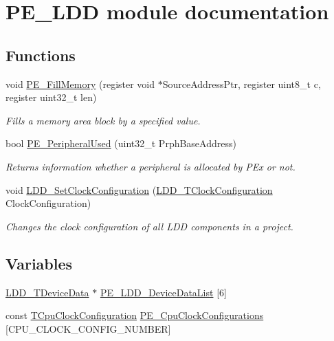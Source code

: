 \hypertarget{group___p_e___l_d_d__module}{}\section{P\+E\+\_\+\+L\+DD module documentation}
\label{group___p_e___l_d_d__module}
\subsection*{Functions}
\begin{DoxyCompactItemize}
\item 
void \hyperlink{group___p_e___l_d_d__module_ga6cb22864b71fd00f200c9fb3375f4e29}{P\+E\+\_\+\+Fill\+Memory} (register void $\ast$Source\+Address\+Ptr, register uint8\+\_\+t c, register uint32\+\_\+t len)
\begin{DoxyCompactList}\small\item\em Fills a memory area block by a specified value. \end{DoxyCompactList}\item 
bool \hyperlink{group___p_e___l_d_d__module_ga9e049b01a45212fe5b6a8476fe124b59}{P\+E\+\_\+\+Peripheral\+Used} (uint32\+\_\+t Prph\+Base\+Address)
\begin{DoxyCompactList}\small\item\em Returns information whether a peripheral is allocated by P\+Ex or not. \end{DoxyCompactList}\item 
void \hyperlink{group___p_e___l_d_d__module_ga7fe8a131453ba765c5e85130a282eafb}{L\+D\+D\+\_\+\+Set\+Clock\+Configuration} (\hyperlink{group___p_e___types__module_ga369bcaf7f00caad5f994c72ac2629a37}{L\+D\+D\+\_\+\+T\+Clock\+Configuration} Clock\+Configuration)
\begin{DoxyCompactList}\small\item\em Changes the clock configuration of all L\+DD components in a project. \end{DoxyCompactList}\end{DoxyCompactItemize}
\subsection*{Variables}
\begin{DoxyCompactItemize}
\item 
\hyperlink{group___p_e___types__module_gac5cf1362f1f0e3a2ce71b1bf2276d091}{L\+D\+D\+\_\+\+T\+Device\+Data} $\ast$ \hyperlink{group___p_e___l_d_d__module_ga654c73169e3f1d8c3106e15497086517}{P\+E\+\_\+\+L\+D\+D\+\_\+\+Device\+Data\+List} \mbox{[}6\mbox{]}
\item 
const \hyperlink{struct_t_cpu_clock_configuration}{T\+Cpu\+Clock\+Configuration} \hyperlink{group___p_e___l_d_d__module_gab69281f0e90d16198a5595ed7f471441}{P\+E\+\_\+\+Cpu\+Clock\+Configurations} \mbox{[}C\+P\+U\+\_\+\+C\+L\+O\+C\+K\+\_\+\+C\+O\+N\+F\+I\+G\+\_\+\+N\+U\+M\+B\+ER\mbox{]}
\end{DoxyCompactItemize}


